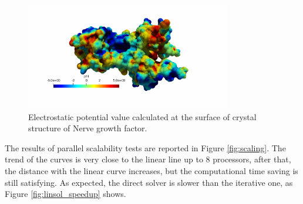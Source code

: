 \documentclass[11pt,a4paper]{article}
\begin{document}
\begin{figure}[H]
    \centering
    \includegraphics[width=0.8\textwidth]{Images/4xpj.png}
    \caption{Electrostatic potential value calculated at the surface of crystal structure of Nerve growth factor.}
    \label{fig:4xpj}
\end{figure}

The results of parallel scalability tests are reported in Figure \ref{fig:scaling}. The trend of the curves is very close to the linear line up to 8 processors, after that, the distance with the linear curve increases, but the computational time saving is still satisfying. As expected, the direct solver is slower than the iterative one, as Figure \ref{fig:linsol_speedup} shows.      
\end{document}
